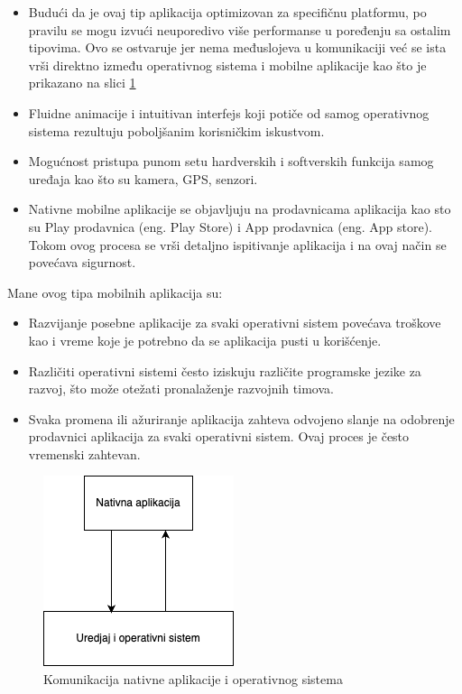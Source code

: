\documentclass[12pt,oneside]{memoir}
\begin{document}
\begin{itemize}
    \item Budući da je ovaj tip aplikacija optimizovan za specifičnu platformu, po pravilu se mogu izvući neuporedivo više performanse u poređenju sa ostalim tipovima. Ovo se ostvaruje jer nema međuslojeva u komunikaciji već se ista vrši direktno između operativnog sistema i mobilne aplikacije kao što je prikazano na slici \ref{fig:nativeMobileApp}
    \item Fluidne animacije i intuitivan interfejs koji potiče od samog operativnog sistema rezultuju poboljšanim korisničkim iskustvom.
    \item Mogućnost pristupa punom setu hardverskih i softverskih funkcija samog uređaja kao što su kamera, GPS, senzori.
    \item Nativne mobilne aplikacije se objavljuju na prodavnicama aplikacija kao sto su Play prodavnica (eng. Play Store) i App prodavnica (eng. App store). Tokom ovog procesa se vrši detaljno ispitivanje aplikacija i na ovaj način se povećava sigurnost.
\end{itemize}
Mane ovog tipa mobilnih aplikacija su:
\begin{itemize}
    \item Razvijanje posebne aplikacije za svaki operativni sistem povećava troškove kao i vreme koje je potrebno da se aplikacija pusti u korišćenje.
    \item Različiti operativni sistemi često iziskuju različite programske jezike za razvoj, što može otežati pronalaženje razvojnih timova.
    \item Svaka promena ili ažuriranje aplikacija zahteva odvojeno slanje na odobrenje prodavnici aplikacija za svaki operativni sistem. Ovaj proces je često vremenski zahtevan.
\end{itemize}

\begin{figure}[h]
    \centering
    \includegraphics[scale=0.5]{docs/images/chapterTwo/nativnaAplikacija.png}
    \caption{Komunikacija nativne aplikacije i operativnog sistema}
    \label{fig:nativeMobileApp}
\end{figure}
\end{document}
